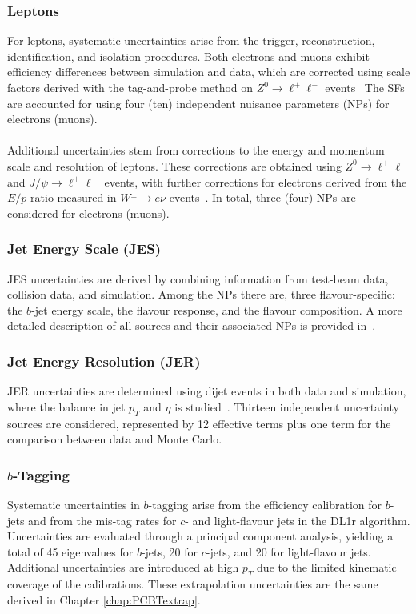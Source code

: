 \subsubsection{Leptons}
For leptons, systematic uncertainties arise from the trigger, reconstruction, identification, and isolation procedures. Both electrons and muons exhibit efficiency differences between simulation and data, which are corrected using scale factors derived with the tag-and-probe method on $Z^{0} \to \ell^{+}\ell^{-}$ events~\cite{atlas2021muon}  
The SFs are accounted for using four (ten) independent nuisance parameters (NPs) for electrons (muons).\\
\\
Additional uncertainties stem from corrections to the energy and momentum scale and resolution of leptons.  These corrections are obtained using $Z^{0} \to \ell^{+}\ell^{-}$ and $J/\psi \to \ell^{+}\ell^{-}$ events, with further corrections for electrons derived from the $E/p$ ratio measured in $W^{\pm} \to e\nu$ events~\cite{atlas2019electron}. In total, three (four) NPs are considered for electrons (muons).  

\subsubsection{Jet Energy Scale (JES)}
JES uncertainties are derived by combining information from test-beam data, collision data, and simulation.  Among the NPs there are, three flavour-specific: the $b$-jet energy scale, the flavour response, and the flavour composition.  A more detailed description of all sources and their associated NPs is provided in~\cite{JER-JES}.  

\subsubsection{Jet Energy Resolution (JER)}
JER uncertainties are determined using dijet events in both data and simulation, where the balance in jet $p_{T}$ and $\eta$ is studied~\cite{JER-JES}.  
Thirteen independent uncertainty sources are considered, represented by 12 effective terms plus one term for the comparison between data and Monte Carlo.  

\subsubsection{$b$-Tagging}
Systematic uncertainties in $b$-tagging arise from the efficiency calibration for $b$-jets and from the mis-tag rates for $c$- and light-flavour jets in the DL1r algorithm. Uncertainties are evaluated through a principal component analysis, yielding a total of 45 eigenvalues for $b$-jets, 20 for $c$-jets, and 20 for light-flavour jets. Additional uncertainties are introduced at high $p_{T}$ due to the limited kinematic coverage of the calibrations. These extrapolation uncertainties are the same derived in Chapter \ref{chap:PCBTextrap}. 
